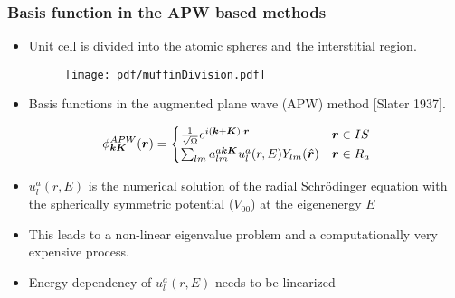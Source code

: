 \documentclass[10pt, handout]{beamer}
\newcommand{\br}{\bm{r}}
\newcommand{\bK}{\bm{K}}
\newcommand{\bk}{\bm{k}}
\newcommand{\nologo}{\setbeamertemplate{logo}{}}  %
\begin{document}
{\nologo
	\begin{frame}
		\frametitle{Basis function in the APW based methods}
\small{
	\begin{itemize}
	\item Unit cell is divided into the atomic spheres and the interstitial region.			
		\begin{figure}			
			\texttt{[image: pdf/muffinDivision.pdf]}	
		\end{figure} 
		
	\item Basis functions in the augmented plane wave (APW) method [Slater 1937].

\begin{eqnarray}\nonumber
	\phi_{\bk\bK}^{APW}(\br) =  \begin{cases}
		\frac{1}{\sqrt{\Omega}} e^{i(\bk+\bK)\cdot\br}         & \br \in IS  \\
		\sum_{lm} a_{lm}^{a\bk\bK} u_{l}^a(r,E) Y_{lm}(\hat{\br}) & \br \in R_a
	\end{cases}\hspace{0.5cm}\label{APW_Basis_functions11}
\end{eqnarray}

	\item $u_{l}^a(r,E)$
	is the numerical solution of the radial Schr\"odinger equation with the spherically symmetric potential ($V_{00}$)
	at the eigenenergy $E$
	\item This leads to a non-linear eigenvalue problem and a computationally very expensive process.
	\item Energy dependency of $u_l^a(r,E)$ needs to be linearized
\end{itemize}
}		
	\end{frame}
}
\end{document}

